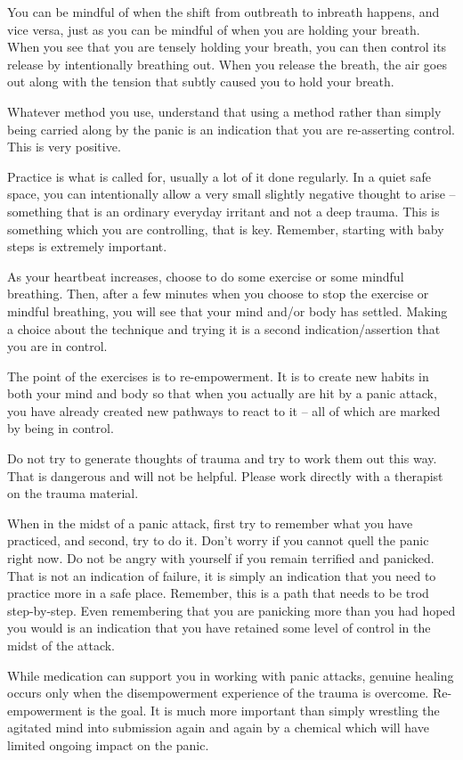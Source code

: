 \documentclass[]{book}
\begin{document}
You can be mindful of when the shift from outbreath to inbreath happens, and vice versa, just as you can be mindful of when you are holding your breath. When you see that you are tensely holding your breath, you can then control its release by intentionally breathing out. When you release the breath, the air goes out along with the tension that subtly caused you to hold your breath.

Whatever method you use, understand that using a method rather than simply being carried along by the panic is an indication that you are re-asserting control. This is very positive.

Practice is what is called for, usually a lot of it done regularly. In a quiet safe space, you can intentionally allow a very small slightly negative thought to arise -- something that is an ordinary everyday irritant and not a deep trauma. This is something which you are controlling, that is key. Remember, starting with baby steps is extremely important.

As your heartbeat increases, choose to do some exercise or some mindful breathing. Then, after a few minutes when you choose to stop the exercise or mindful breathing, you will see that your mind and/or body has settled. Making a choice about the technique and trying it is a second indication/assertion that you are in control.

The point of the exercises is to re-empowerment. It is to create new habits in both your mind and body so that when you actually are hit by a panic attack, you have already created new pathways to react to it -- all of which are marked by being in control.

Do not try to generate thoughts of trauma and try to work them out this way. That is dangerous and will not be helpful. Please work directly with a therapist on the trauma material.

When in the midst of a panic attack, first try to remember what you have practiced, and second, try to do it. Don't worry if you cannot quell the panic right now. Do not be angry with yourself if you remain terrified and panicked. That is not an indication of failure, it is simply an indication that you need to practice more in a safe place. Remember, this is a path that needs to be trod step-by-step. Even remembering that you are panicking more than you had hoped you would is an indication that you have retained some level of control in the midst of the attack.

While medication can support you in working with panic attacks, genuine healing occurs only when the disempowerment experience of the trauma is overcome. Re-empowerment is the goal. It is much more important than simply wrestling the agitated mind into submission again and again by a chemical which will have limited ongoing impact on the panic.
\end{document}
